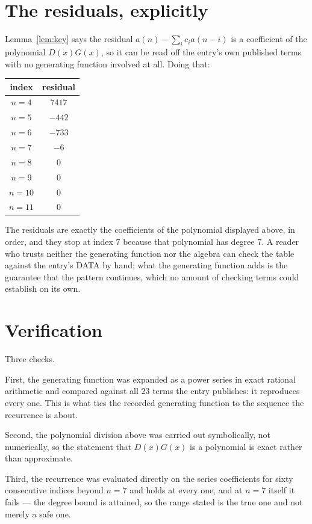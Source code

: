 \documentclass[11pt,a4paper]{article}
\theoremstyle{plain}
\theoremstyle{definition}
\begin{document}
\section{The residuals, explicitly}

Lemma~\ref{lem:key} says the residual $a(n)-\sum_ic_ia(n-i)$ is a coefficient of the
polynomial $D(x)G(x)$, so it can be read off the entry's own published terms with no
generating function involved at all. Doing that:
\begin{center}
\begin{tabular}{cc}
index & residual \\ \hline
$n=4$ & $7417$ \\
$n=5$ & $-442$ \\
$n=6$ & $-733$ \\
$n=7$ & $-6$ \\
$n=8$ & $0$ \\
$n=9$ & $0$ \\
$n=10$ & $0$ \\
$n=11$ & $0$
\end{tabular}
\end{center}
The residuals are exactly the coefficients of the polynomial displayed above, in order, and
they stop at index $7$ because that polynomial has degree $7$. A reader who trusts
neither the generating function nor the algebra can check the table against the entry's DATA
by hand; what the generating function adds is the guarantee that the pattern continues, which
no amount of checking terms could establish on its own.

\section{Verification}

Three checks.

First, the generating function was expanded as a power series in exact rational arithmetic and
compared against all $23$ terms the entry publishes: it reproduces every one. This is
what ties the recorded generating function to the sequence the recurrence is about.

Second, the polynomial division above was carried out symbolically, not numerically, so the
statement that $D(x)G(x)$ is a polynomial is exact rather than approximate.

Third, the recurrence was evaluated directly on the series coefficients for sixty consecutive
indices beyond $n=7$ and holds at every one, and at $n=7$ itself it fails --- the
degree bound is attained, so the range stated is the true one and not merely a safe one.
\end{document}
